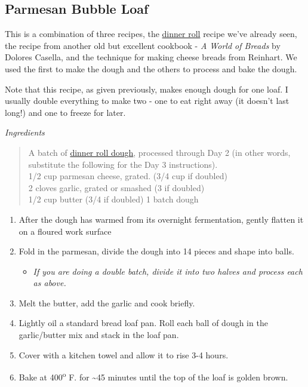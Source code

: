 \documentclass[
]{book}
\providecommand{\tightlist}{%
  \setlength{\itemsep}{0pt}\setlength{\parskip}{0pt}}
\begin{document}
\hypertarget{parmesan-bubble-loaf}{%
\subsection{Parmesan Bubble Loaf}\label{parmesan-bubble-loaf}}

This is a combination of three recipes, the \protect\hyperlink{drolls}{dinner roll} recipe we've already seen, the recipe from another old but excellent cookbook - \emph{A World of Breads} by Dolores Casella, and the technique for making cheese breads from Reinhart. We used the first to make the dough and the others to process and bake the dough.

Note that this recipe, as given previously, makes enough dough for one loaf. I usually double everything to make two - one to eat right away (it doesn't last long!) and one to freeze for later.

\emph{Ingredients}

\begin{quote}
A batch of \href{$drolls}{dinner roll dough}, processed through Day 2 (in other words, substitute the following for the Day 3 instructions).\\
1/2 cup parmesan cheese, grated. (3/4 cup if doubled)\\
2 cloves garlic, grated or smashed (3 if doubled)\\
1/2 cup butter (3/4 if doubled)
1 batch dough
\end{quote}

\begin{enumerate}
\def\labelenumi{\arabic{enumi}.}
\tightlist
\item
  After the dough has warmed from its overnight fermentation, gently flatten it on a floured work surface
\item
  Fold in the parmesan, divide the dough into 14 pieces and shape into balls.

  \begin{itemize}
  \tightlist
  \item
    \emph{If you are doing a double batch, divide it into two halves and process each as above.}
  \end{itemize}
\item
  Melt the butter, add the garlic and cook briefly.
\item
  Lightly oil a standard bread loaf pan. Roll each ball of dough in the garlic/butter mix and stack in the loaf pan.
\item
  Cover with a kitchen towel and allow it to rise 3-4 hours.
\item
  Bake at 400\textsuperscript{o} F. for \textasciitilde45 minutes until the top of the loaf is golden brown.
\end{enumerate}
\end{document}
